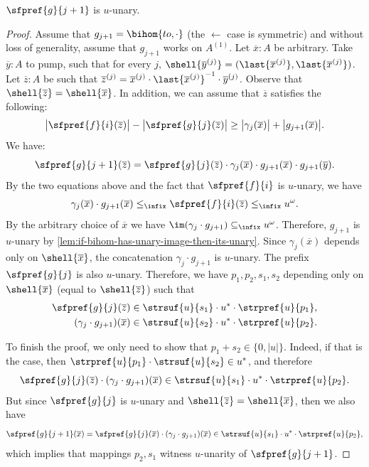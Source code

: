\begin{claim}
    $\sfpref{g}{j+1}$ is $u$-unary.
\end{claim}

\begin{proof}
    Assume that $g_{j+1} = \bihom{to, \cdot}$ (the $\leftarrow$ case is symmetric) and without loss of generality, assume that $g_{j+1}$ works on $A^{(1)}$. Let $\overline x : A$ be arbitrary. Take $\overline y : A$ to pump, such that for every $j$, $\shell{\overline y^{(j)}} = (\last{\overline x^{(j)}}, \last{\overline x^{(j)}})$. Let $\overline z : A$ be such that $\overline z^{(j)} = \overline x^{(j)} \cdot \last{\overline x^{(j)}}^{-1} \cdot \overline y^{(j)}$. Observe that $\shell{\overline z} = \shell{\overline x}$. In addition, we can assume that $\overline z$ satisfies the following: 
    \[
        \big|\sfpref{f}{i}(\overline z) \big| - \big|\sfpref{g}{j}(\overline z) \big| \geq \big|\gamma_j(\overline x)\big| + \big|g_{j+1}(\overline x)\big|.
    \]
    We have:
    \[
        \sfpref{g}{j+1}(\overline z) = \sfpref{g}{j}(\overline z) \cdot \gamma_j(\overline x) \cdot g_{j+1}(\overline x) \cdot g_{j+1}(\overline y).
    \]
    By the two equations above and the fact that $\sfpref{f}{i}$ is $u$-unary, we have
    \[
        \gamma_j(\overline x) \cdot g_{j+1}(\overline x) \leq_\infix \sfpref{f}{i}(\overline z) \leq_\infix u^\omega.
    \]
    By the arbitrary choice of $\overline x$ we have $\im(\gamma_j \cdot g_{j+1}) \subseteq_\infix u^\omega$. Therefore, $g_{j+1}$ is $u$-unary by \cref{lem:if-bihom-has-unary-image-then-its-unary}. Since $\gamma_j(\overline x)$ depends only on $\shell{\overline x}$, the concatenation $\gamma_j \cdot g_{j+1}$ is $u$-unary. The prefix $\sfpref{g}{j}$ is also $u$-unary. Therefore, we have $p_1,p_2,s_1,s_2$ depending only on $\shell{\overline x}$ (equal to $\shell{\overline z}$) such that
    \begin{align*}
        \sfpref{g}{j}(\overline z) &\in \strsuf{u}{s_1} \cdot u^* \cdot \strpref{u}{p_1}, \\
        (\gamma_j \cdot g_{j+1})(\overline x) &\in \strsuf{u}{s_2} \cdot u^* \cdot \strpref{u}{p_2}. 
    \end{align*}

    To finish the proof, we only need to show that $p_1 + s_2 \in \{0, |u| \}$. Indeed, if that is the case, then $\strpref{u}{p_1} \cdot \strsuf{u}{s_2} \in u^*$, and therefore 
    \[
        \sfpref{g}{j}(\overline z) \cdot (\gamma_j \cdot g_{j+1})(\overline x) \in \strsuf{u}{s_1} \cdot u^* \cdot \strpref{u}{p_2}.
    \]
    But since $\sfpref{g}{j}$ is $u$-unary and $\shell{\overline z} = \shell{\overline x}$, then we also have 
    \[
        \sfpref{g}{j+1}(\overline x) = \sfpref{g}{j}(\overline x) \cdot (\gamma_j \cdot g_{j+1})(\overline x) \in \strsuf{u}{s_1} \cdot u^* \cdot \strpref{u}{p_2},
    \]
    which implies that mappings $p_2,s_1$ witness $u$-unarity of $\sfpref{g}{j+1}$.


\end{proof}
